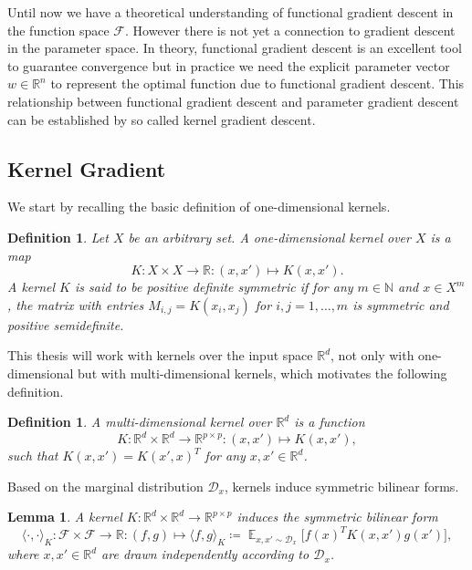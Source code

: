\documentclass[11pt, a4paper]{article}
\newtheorem{lemma}[theorem]{Lemma}
\newtheorem{definition}[theorem]{Definition}
\newcommand{\N}{\mathds{N}}
\newcommand{\R}{\mathds{R}}
\newcommand{\D}{\mathcal{D}}
\newcommand{\F}{\mathcal{F}}
\DeclareMathOperator*{\E}{\mathds{E}}
\begin{document}
Until now we have a theoretical understanding of functional gradient descent in the function space $\F$. However there is not yet a connection to gradient descent in the parameter space. In theory, functional gradient descent is an excellent tool to guarantee convergence but in practice we need the explicit parameter vector $w \in \R^n$ to represent the optimal function due to functional gradient descent. This relationship between functional gradient descent and parameter gradient descent can be established by so called kernel gradient descent. 

\subsection{Kernel Gradient}

We start by recalling the basic definition of one-dimensional kernels.

\begin{definition}
Let $X$ be an arbitrary set. A one-dimensional kernel over $X$ is a map 
\[ K: X \times X \to \R : (x,x') \mapsto K(x,x').\]
A kernel $K$ is said to be positive definite symmetric if for any $m \in \N$ and $x \in X^m$, the matrix with entries $M_{i,j} = K(x_i,x_j)$ for $i,j = 1, \dots, m$ is symmetric and positive semidefinite.
\end{definition}

This thesis will work with kernels over the input space $\R^d$, not only with one-dimensional but with multi-dimensional kernels, which motivates the following definition.

\begin{definition}
A multi-dimensional kernel over $\R^d$ is a function
\[ K: \R^d \times \R^d \to \R^{p \times p} : (x,x') \mapsto K(x,x'), \]
such that $K(x,x') = K(x',x)^T$ for any $x,x' \in \R^d$.
\end{definition}

Based on the marginal distribution $\D_x$, kernels induce symmetric bilinear forms.

\begin{lemma} \label{lem:form}
A kernel $K: \R^d \times \R^d \to \R^{p \times p}$ induces the symmetric bilinear form
\[ \langle \cdot, \cdot \rangle_K : \F \times \F \to \R : (f,g) \mapsto \langle f , g \rangle _K \coloneq \E_{x,x' \sim \D_x} \Big [ f(x)^T K(x,x') g(x') \Big ], \]
where $x, x' \in \R^d$ are drawn independently according to $\D_x$. 
\end{lemma}
\end{document}
